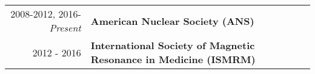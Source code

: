 
\begin{minipage}{\textwidth}
	\begin{tabular}{r|l}
		2008-2012, 2016-\emph{Present} & \textbf{American Nuclear Society (ANS)} \\
		2012 - 2016 & \textbf{International Society of Magnetic Resonance in Medicine (ISMRM)} \\
	\end{tabular}
\end{minipage}
